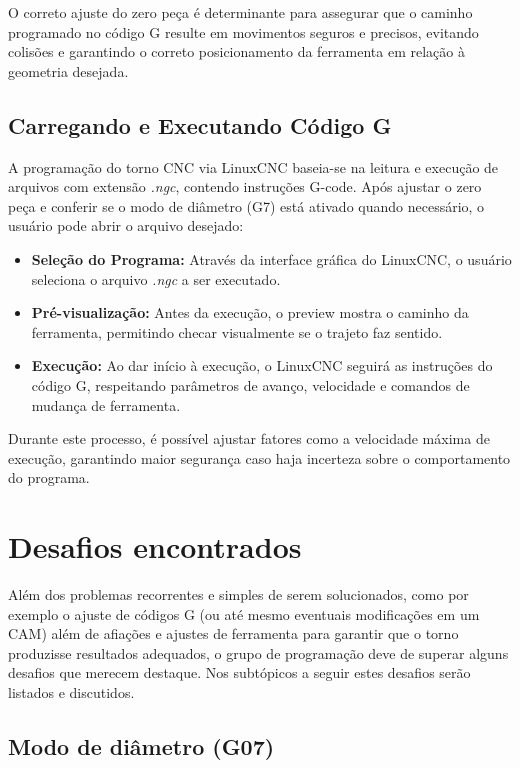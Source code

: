 O correto ajuste do zero peça é determinante para assegurar que o caminho programado no código G resulte em movimentos seguros e precisos, evitando colisões e garantindo o correto posicionamento da ferramenta em relação à geometria desejada.

\subsection{Carregando e Executando Código G}

A programação do torno CNC via LinuxCNC baseia-se na leitura e execução de arquivos com extensão \textit{.ngc}, contendo instruções G-code. Após ajustar o zero peça e conferir se o modo de diâmetro (G7) está ativado quando necessário, o usuário pode abrir o arquivo desejado:

\begin{itemize}
    \item \textbf{Seleção do Programa:} Através da interface gráfica do LinuxCNC, o usuário seleciona o arquivo \textit{.ngc} a ser executado.
    \item \textbf{Pré-visualização:} Antes da execução, o preview mostra o caminho da ferramenta, permitindo checar visualmente se o trajeto faz sentido.
    \item \textbf{Execução:} Ao dar início à execução, o LinuxCNC seguirá as instruções do código G, respeitando parâmetros de avanço, velocidade e comandos de mudança de ferramenta.
\end{itemize}

Durante este processo, é possível ajustar fatores como a velocidade máxima de execução, garantindo maior segurança caso haja incerteza sobre o comportamento do programa.

\section{Desafios encontrados}

Além dos problemas recorrentes e simples de serem solucionados, como por exemplo o ajuste de códigos G (ou até mesmo eventuais modificações em um CAM) além de afiações e ajustes de ferramenta para garantir que o torno produzisse resultados adequados, o grupo de programação deve de superar alguns desafios que merecem destaque. Nos subtópicos a seguir estes desafios serão listados e discutidos.

\subsection{Modo de diâmetro (G07)}


